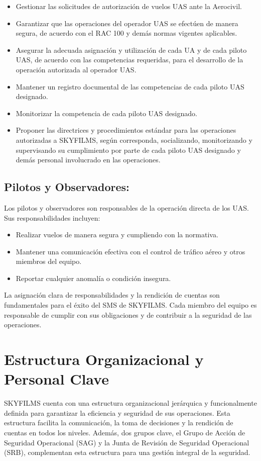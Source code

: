 \begin{itemize}
    \item Gestionar las solicitudes de autorización de vuelos UAS ante la Aerocivil.
    \item Garantizar que las operaciones del operador UAS se efectúen de manera segura, de acuerdo con el RAC 100 y demás normas vigentes aplicables.
    \item Asegurar la adecuada asignación y utilización de cada UA y de cada piloto UAS, de acuerdo con las competencias requeridas, para el desarrollo de la operación autorizada al operador UAS.
    \item Mantener un registro documental de las competencias de cada piloto UAS designado.
    \item Monitorizar la competencia de cada piloto UAS designado.
    \item Proponer las directrices y procedimientos estándar para las operaciones autorizadas a SKYFILMS, según corresponda, socializando, monitorizando y supervisando su cumplimiento por parte de cada piloto UAS designado y demás personal involucrado en las operaciones.
\end{itemize}

\subsection{Pilotos y Observadores:} Los pilotos y observadores son responsables de la operación directa de los UAS. Sus responsabilidades incluyen:

\begin{itemize}
    \item Realizar vuelos de manera segura y cumpliendo con la normativa.
    \item Mantener una comunicación efectiva con el control de tráfico aéreo y otros miembros del equipo.
    \item Reportar cualquier anomalía o condición insegura.
\end{itemize}

La asignación clara de responsabilidades y la rendición de cuentas son fundamentales para el éxito del SMS de SKYFILMS. Cada miembro del equipo es responsable de cumplir con sus obligaciones y de contribuir a la seguridad de las operaciones.

\section{Estructura Organizacional y Personal Clave}
SKYFILMS cuenta con una estructura organizacional jerárquica y funcionalmente definida para garantizar la eficiencia y seguridad de sus operaciones. Esta estructura facilita la comunicación, la toma de decisiones y la rendición de cuentas en todos los niveles. Además, dos grupos clave, el Grupo de Acción de Seguridad Operacional (SAG) y la Junta de Revisión de Seguridad Operacional (SRB), complementan esta estructura para una gestión integral de la seguridad.\\

